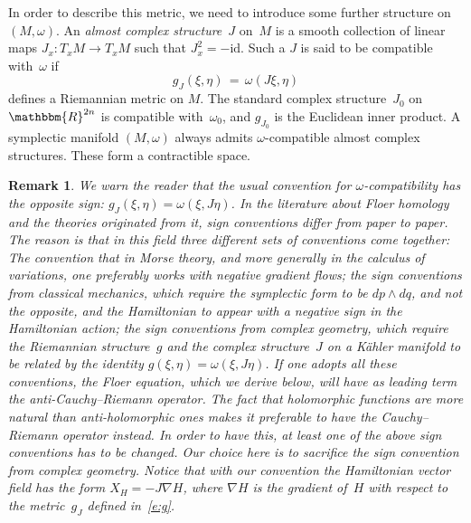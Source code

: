 \documentclass[12pt,twoside]{amsart}
\theoremstyle{plain}
\newtheorem{remark}[theorem]{Remark}
\numberwithin{figure}{section}
\numberwithin{equation}{section}
\def\go{\omega}
\def\RR{\mathbbm{R}}
\def\id{\mbox{id}}
\begin{document}
In order to describe this metric, we need to introduce some further structure on~$(M,\omega)$. 
An {\em almost complex structure}~$J$ on~$M$ is a smooth collection of linear maps 
$J_x \colon T_xM \to T_xM$ such that $J_x^2 = -\id$. Such a $J$ is said to be compatible with~$\go$ if 
%
\begin{equation} \label{e:g}
g_J(\xi,\eta) \,=\, \omega (J\xi, \eta)
\end{equation}
%
defines a Riemannian metric on $M$. The standard complex structure~$J_0$ on~$\RR^{2n}$ is compatible 
with~$\omega_0$, and $g_{J_0}$ is the Euclidean inner product. 
A symplectic manifold $(M,\omega)$ always admits $\omega$-compatible almost complex structures. 
These form a contractible space.

\begin{remark}
{\rm 
We warn the reader that the usual convention for $\omega$-compatibility has the opposite sign: 
$g_J(\xi,\eta) = \omega (\xi, J\eta)$. In the literature about Floer homology and the theories 
originated from it, sign conventions differ from paper to paper. 
The reason is that in this field three different sets of conventions come together: 
The convention that in Morse theory, and more generally in the calculus of variations, 
one preferably works with {\em negative}\/ gradient flows; 
the sign conventions from classical mechanics, which require the symplectic form to be 
$dp\wedge dq$, and not the opposite, and the Hamiltonian to appear with a negative sign in the Hamiltonian action; 
the sign conventions from complex geometry, which require the Riemannian structure~$g$ and the complex structure~$J$ on a K\"ahler manifold to be related by the identity $g(\xi,\eta)=\omega(\xi,J\eta)$. 
If one adopts all these conventions, the Floer equation, which we derive below, will have as 
leading term the anti-Cauchy--Riemann operator. The fact that holomorphic functions are more 
natural than anti-holomorphic ones makes it preferable to have the Cauchy--Riemann operator 
instead. In order to have this, at least one of the above sign conventions has to be changed. 
Our choice here is to sacrifice the sign convention from complex geometry. 
Notice that with our convention the Hamiltonian vector field has the form $X_H = - J \nabla H$, 
where $\nabla H$ is the gradient of~$H$ with respect to the metric~$g_J$ defined in~\eqref{e:g}.
}
\end{remark}
\end{document}
